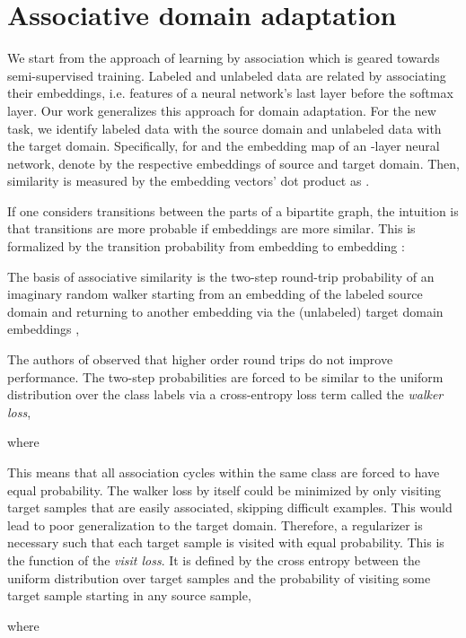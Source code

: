 \documentclass[10pt,twocolumn,letterpaper]{article}
\begin{document}
\section{Associative domain adaptation}\label{sec:domain_adaptation_by_associative_learning}
We start from the approach of learning by association \cite{Haeusser2017} which is geared towards semi-supervised training. 
Labeled and unlabeled data are related by associating their embeddings, i.e. features of a neural network's last layer before the softmax layer.
Our work generalizes this approach for domain adaptation.
For the new task, we identify labeled data with the source domain and unlabeled data with the target domain.
Specifically, for  and the embedding map  of an -layer neural network, denote by  the respective embeddings of source and target domain.
Then, similarity is measured by the embedding vectors' dot product as .

If one considers transitions between the parts  of a bipartite graph, the intuition is that transitions are more probable if embeddings are more similar. This is formalized by the transition probability from embedding  to embedding :


The basis of associative similarity is the two-step round-trip probability of an imaginary random walker starting from an embedding  of the labeled source domain and returning to another embedding  via the (unlabeled) target domain embeddings ,



The authors of \cite{Haeusser2017} observed that higher order round trips do not improve performance.
The two-step probabilities are forced to be similar to the uniform distribution over the class labels via a cross-entropy loss term called the \textit{walker loss},

where


This means that all association cycles within the same class are forced to have equal probability. The walker loss by itself could be minimized by only visiting target samples that are easily associated, skipping difficult examples. This would lead to poor generalization to the target domain.
Therefore, a regularizer is necessary such that each target sample is visited with equal probability.
This is the function of the \textit{visit loss}. It is defined by the cross entropy between the uniform distribution over target samples and the probability of visiting some target sample starting in any source sample,

where 
\end{document}
